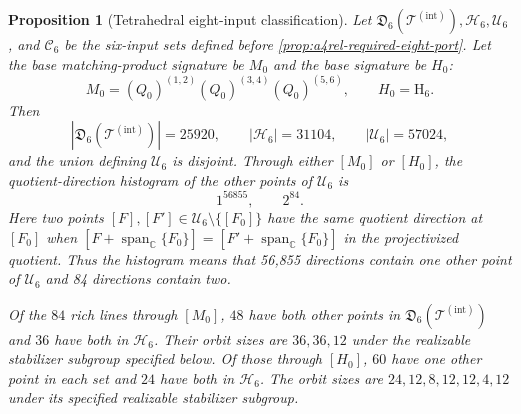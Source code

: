 \documentclass[11pt,letterpaper,onecolumn]{article}
\theoremstyle{plain}
\newtheorem{proposition}[proposition]{Proposition}
\theoremstyle{definition}
\theoremstyle{remark}
\newcommand{\TetInt}{{\mathcal T^{(\mathrm{int})}}}
\newcommand{\Span}{\operatorname{span}}
\newcommand{\Hcore}{\mathrm{H}_6}
\begin{document}
\begin{proposition}[Tetrahedral eight-input classification]
\label{prop:cert-A4-b8-parent-audit}
Let \(\mathfrak D_6(\TetInt),\mathscr H_6,\mathscr U_6\), and \(\mathscr C_6\) be
the six-input sets defined before
\cref{prop:a4rel-required-eight-port}. Let the base matching-product signature
be \(M_0\) and the base signature be \(H_0\):
\[
 M_0=(Q_0)^{(1,2)}(Q_0)^{(3,4)}(Q_0)^{(5,6)},
 \qquad H_0=\Hcore.
\]
Then
\begin{equation}
 |\mathfrak D_6(\TetInt)|=25920,\qquad
 |\mathscr H_6|=31104,\qquad
 |\mathscr U_6|=57024,
 \label{eq:cert-A4-b8-safe-set-sizes}
\end{equation}
and the union defining \(\mathscr U_6\) is disjoint.  Through either
\([M_0]\) or \([H_0]\), the quotient-direction histogram of the other points of \(\mathscr U_6\) is
\begin{equation}
  1^{56855},\qquad 2^{84}.
  \label{eq:cert-A4-b8-line-histogram}
\end{equation}
Here two points \([F],[F']\in\mathscr U_6\setminus\{[F_0]\}\) have the same quotient direction at
\([F_0]\) when
\([F+\Span_{\mathbb C}\{F_0\}]
 =[F'+\Span_{\mathbb C}\{F_0\}]\) in the projectivized
quotient.  Thus the histogram means that
56,855 directions contain one other point of \(\mathscr U_6\) and 84 directions contain
two.

Of the \(84\) rich lines through \([M_0]\), \(48\) have both other points in
\(\mathfrak D_6(\TetInt)\) and \(36\) have both in \(\mathscr H_6\). Their orbit
sizes are \(36,36,12\) under the realizable stabilizer subgroup specified below. Of those through \([H_0]\), \(60\) have
one other point in each set and \(24\) have both in \(\mathscr H_6\). The orbit
sizes are \(24,12,8,12,12,4,12\) under its specified realizable stabilizer subgroup.


\end{proposition}
\end{document}
